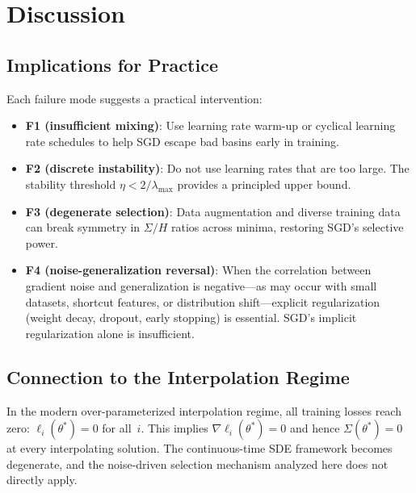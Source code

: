 \documentclass[11pt,a4paper]{article}
\begin{document}
\section{Discussion}
\label{sec:discussion}

\subsection{Implications for Practice}
\label{sec:practice}

Each failure mode suggests a practical intervention:
\begin{itemize}[nosep]
  \item \textbf{F1 (insufficient mixing)}: Use learning rate warm-up or
        cyclical learning rate schedules to help SGD escape bad basins early
        in training.
  \item \textbf{F2 (discrete instability)}: Do not use learning rates that
        are too large.  The stability threshold $\eta < 2/\lambda_{\max}$
        provides a principled upper bound.
  \item \textbf{F3 (degenerate selection)}: Data augmentation and diverse
        training data can break symmetry in $\Sigma/H$ ratios across minima,
        restoring SGD's selective power.
  \item \textbf{F4 (noise-generalization reversal)}: When the correlation
        between gradient noise and generalization is negative---as may occur
        with small datasets, shortcut features, or distribution shift---explicit
        regularization (weight decay, dropout, early stopping) is essential.
        SGD's implicit regularization alone is insufficient.
\end{itemize}

\subsection{Connection to the Interpolation Regime}
\label{sec:interpolation}

In the modern over-parameterized interpolation regime, all training losses
reach zero: $\ell_i(\theta^*)=0$ for all~$i$.  This implies
$\nabla\ell_i(\theta^*)=0$ and hence $\Sigma(\theta^*)=0$ at every
interpolating solution.  The continuous-time SDE framework becomes degenerate,
and the noise-driven selection mechanism analyzed here does not directly apply.
\end{document}
